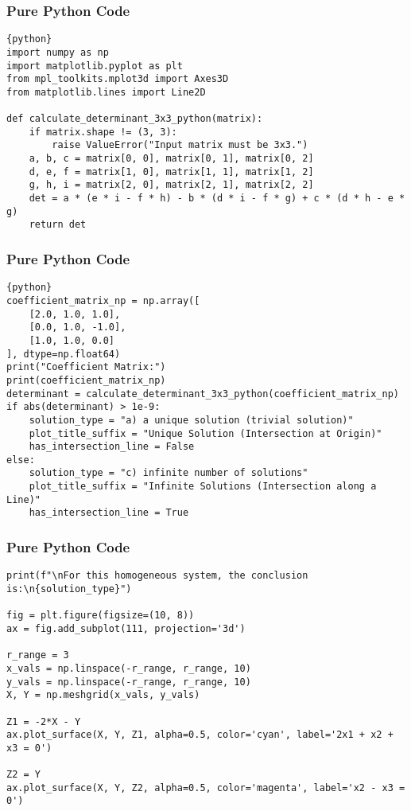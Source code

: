 \documentclass{beamer}
\begin{document}
\begin{frame}[fragile]
\frametitle{Pure Python Code}
\begin{lstlisting}{python}
import numpy as np
import matplotlib.pyplot as plt
from mpl_toolkits.mplot3d import Axes3D
from matplotlib.lines import Line2D

def calculate_determinant_3x3_python(matrix):
    if matrix.shape != (3, 3):
        raise ValueError("Input matrix must be 3x3.")
    a, b, c = matrix[0, 0], matrix[0, 1], matrix[0, 2]
    d, e, f = matrix[1, 0], matrix[1, 1], matrix[1, 2]
    g, h, i = matrix[2, 0], matrix[2, 1], matrix[2, 2]
    det = a * (e * i - f * h) - b * (d * i - f * g) + c * (d * h - e * g)
    return det
\end{lstlisting}
\end{frame}

\begin{frame}[fragile]
\frametitle{Pure Python Code}
\begin{lstlisting}{python}
coefficient_matrix_np = np.array([
    [2.0, 1.0, 1.0],
    [0.0, 1.0, -1.0],
    [1.0, 1.0, 0.0]
], dtype=np.float64)
print("Coefficient Matrix:")
print(coefficient_matrix_np)
determinant = calculate_determinant_3x3_python(coefficient_matrix_np)
if abs(determinant) > 1e-9:
    solution_type = "a) a unique solution (trivial solution)"
    plot_title_suffix = "Unique Solution (Intersection at Origin)"
    has_intersection_line = False
else:
    solution_type = "c) infinite number of solutions"
    plot_title_suffix = "Infinite Solutions (Intersection along a Line)"
    has_intersection_line = True
\end{lstlisting}
\end{frame}

\begin{frame}[fragile]
\frametitle{Pure Python Code}
\begin{lstlisting}
print(f"\nFor this homogeneous system, the conclusion is:\n{solution_type}")

fig = plt.figure(figsize=(10, 8))
ax = fig.add_subplot(111, projection='3d')

r_range = 3
x_vals = np.linspace(-r_range, r_range, 10)
y_vals = np.linspace(-r_range, r_range, 10)
X, Y = np.meshgrid(x_vals, y_vals)

Z1 = -2*X - Y
ax.plot_surface(X, Y, Z1, alpha=0.5, color='cyan', label='2x1 + x2 + x3 = 0')

Z2 = Y
ax.plot_surface(X, Y, Z2, alpha=0.5, color='magenta', label='x2 - x3 = 0')
\end{lstlisting}
\end{frame}
\end{document}
